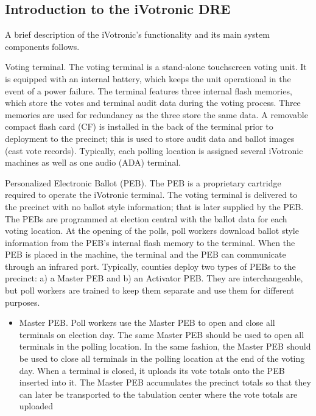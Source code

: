 \documentclass[letterpaper,twocolumn,10pt]{article}
\begin{document}
\subsection{Introduction to the iVotronic DRE}
A brief description of the iVotronic's functionality and its main system
components follows.  

\begin{description}
\item{Voting terminal.} The voting terminal is a stand-alone touchscreen voting
  unit. It is equipped with an internal battery, which keeps the unit operational 
  in the event of a power failure.  The terminal 
  features three internal flash memories, which store the votes and terminal audit 
  data during the voting process. Three memories are used for redundancy as the 
  three store the same data.  A removable compact flash card (CF) is installed in 
  the back of the terminal prior to deployment to the precinct; this is 
  used to store audit data and ballot images (cast vote records). Typically, 
  each polling location is assigned several iVotronic machines as well as one audio 
  (ADA) terminal.
\item{Personalized Electronic Ballot (PEB).} The PEB is a proprietary cartridge
  required to operate the iVotronic terminal. The voting terminal is 
  delivered to the precinct with no ballot style information; that is later supplied 
  by the PEB. The PEBs are programmed at election central with the ballot data
  for each voting location. At the opening of the polls, poll workers 
  download ballot style information from the PEB's internal flash memory to the terminal.  When the PEB is 
  placed in the 
  machine, the terminal and the PEB can communicate through an infrared port.  
  Typically, counties deploy two types of PEBs to the precinct: a) a Master PEB
  and b) an Activator PEB. They are interchangeable, but poll workers are trained 
  to keep them separate and use them for different purposes.
\begin{itemize}
\item{Master PEB.} Poll workers use the Master PEB to open and close all
  terminals on election day. The same Master PEB should be used to open all 
  terminals in the polling location.  In the same fashion, the Master PEB should
  be used to close all terminals in the polling location at the end of the voting
  day.  When a terminal is closed, it uploads its vote totals onto the PEB 
  inserted into it. The Master PEB accumulates the precinct totals so that they can 
  later be transported to the tabulation center where the vote totals are uploaded 

\end{itemize}
\end{description}
\end{document}
